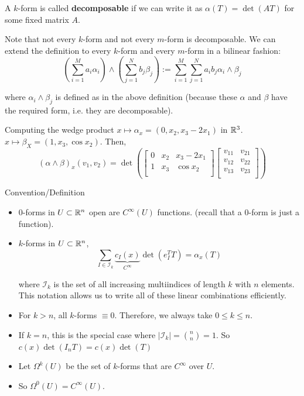 \documentclass[12pt]{article}
\begin{document}
A $k$-form is called \textbf{decomposable} if we can write it as $\alpha(T) = \det(A T)$ for some fixed matrix $A$.

Note that not every $k$-form and not every $m$-form is decomposable. We can extend the definition to every $k$-form and every $m$-form in a bilinear fashion:
\[
    \left(\sum_{i = 1}^{M} a_i \alpha_i\right) \land \left(\sum_{j = 1}^{N} b_j \beta_j\right) := \sum_{i = 1}^{M} \sum_{j = 1}^{N} a_ib_j\alpha_i \land \beta_j
\]

where $\alpha_i \land \beta_j$ is defined as in the above definition (because these $\alpha$ and $\beta$ have the required form, i.e. they are decomposable).

\begin{example}{Computing the wedge product}{}
    $x \mapsto \alpha_x = (0, x_2, x_3-2x_1)$ in $\mathbb{R}^3$. $x \mapsto \beta_X = (1, x_3, \cos x_2)$. Then,
    \[
        (\alpha \land \beta)_x (v_1,v_2) = \det(\begin{bmatrix}
            0 & x_2 & x_3-2x_1\\
            1 & x_3 & \cos x_2 \\
        \end{bmatrix}
        \begin{bmatrix}
            v_{11} & v_{21} \\
            v_{12} & v_{22} \\
            v_{13} & v_{23} \\
        \end{bmatrix})
    \]
\end{example}

\begin{notebox}{Convention/Definition}{}
    \begin{itemize}
        \item $0$-forms in $U \subset \mathbb{R}^n$ open are $C^\infty(U)$ functions. (recall that a $0$-form is just a function).
        \item $k$-forms in $U \subset \mathbb{R}^n$,
        \[
            \sum_{I \in \mathcal{I}_k} \underbrace{c_I(x)}_{C^\infty} \det(e_I^T T) = \alpha_x(T)
        \]

        where $\mathcal{I}_k$ is the set of all increasing multiindices of length $k$ with $n$ elements. This notation allows us to write all of these linear combinations efficiently.

        \item For $k > n$, all $k$-forms $\equiv 0$. Therefore, we always take $0 \leq k \leq n$.
        \item If $k = n$, this is the special case where $|\mathcal{I}_k| = \binom{n}{n} = 1$. So $c(x) \det(I_nT) = c(x) \det(T)$ 
        \item Let $\Omega^k(U)$ be the set of $k$-forms that are $C^\infty$ over $U$.
        \item So $\Omega^0(U) = C^\infty(U)$.
    \end{itemize}
\end{notebox}
\end{document}
